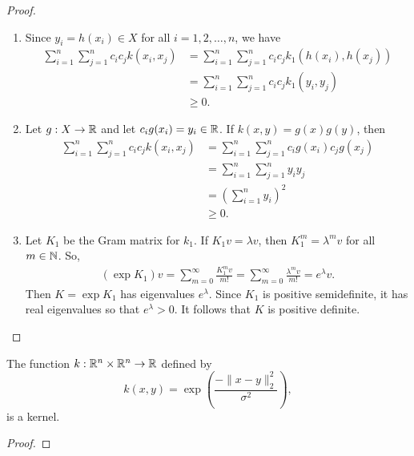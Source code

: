 \begin{proof}
\begin{enumerate}
        \item Since \(y_i = h(x_i) \in X\) for all \(i = 1,2,\dots, n\), we have
        \begin{align*}
            \sum_{i=1}^{n} \sum_{j=1}^{n} c_i c_j k(x_i,x_j)
            &= \sum_{i=1}^{n} \sum_{j=1}^{n} c_i c_j k_1(h(x_i), h(x_j))\\
            &= \sum_{i=1}^{n} \sum_{j=1}^{n} c_i c_j k_1(y_i, y_j)\\
            &\geq 0.
        \end{align*}
        \item Let \(g : X \to \mathbb{R}\) and let \(c_i g(x_i) = y_i \in \mathbb{R}\).
        If \(k(x,y) = g(x)g(y)\), then
        \begin{align*}
            \sum_{i=1}^{n} \sum_{j=1}^{n} c_i c_j k(x_i,x_j)
            &= \sum_{i=1}^{n} \sum_{j=1}^{n} c_i g(x_i) c_j g(x_j)\\
            &= \sum_{i=1}^{n} \sum_{j=1}^{n} y_i y_j\\
            &= \left(\sum_{i=1}^{n} y_i\right)^2\\
            &\geq 0.
        \end{align*}
        \item Let \(K_1\) be the Gram matrix for \(k_1\).
        If \(K_1 v = \lambda v\), then \(K_1^m = \lambda^m v\) for all \(m \in \mathbb{N}\).
        So,
        \begin{align*}
            (\exp K_1) v
            = \sum_{m=0}^{\infty} \frac{K_1^m v}{m!}
            = \sum_{m=0}^{\infty} \frac{\lambda^m v}{m!}
            = e^\lambda v.
        \end{align*}
        Then \(K = \exp K_1\) has eigenvalues \(e^\lambda\).
        Since \(K_1\) is positive semidefinite, it has real eigenvalues so that \(e^\lambda > 0\).
        It follows that \(K\) is positive definite.
    \end{enumerate}
\end{proof}

\begin{theorem}
    \label{thm:gaussian-kernel}
    The function \(k : \mathbb{R}^n \times \mathbb{R}^n \to \mathbb{R}\) defined by
    \[k(x,y) = \exp\left(\dfrac{-\|x-y\|^2_2}{\sigma^2}\right),\]
    is a kernel.
\end{theorem}

\begin{proof}
    
\end{proof}